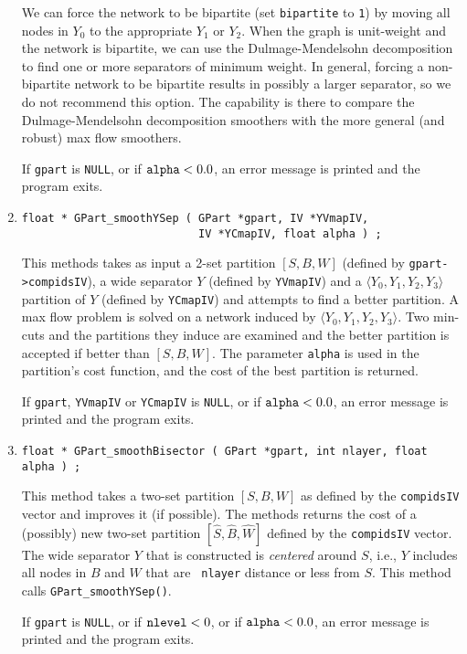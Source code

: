 \begin{enumerate}
We can force the network to be bipartite 
(set {\tt bipartite} to {\tt 1}) by moving all nodes in $Y_0$ to
the appropriate $Y_1$ or $Y_2$.
When the graph is unit-weight and the network is bipartite, 
we can use the Dulmage-Mendelsohn decomposition to find one 
or more separators of minimum weight.
In general, forcing a non-bipartite network to be bipartite results
in possibly a larger separator, so we do not recommend this option.
The capability is there to compare the Dulmage-Mendelsohn
decomposition smoothers with the more general (and robust) max
flow smoothers.
\par {}
If {\tt gpart} is {\tt NULL},
or if ${\tt alpha} < 0.0$,
an error message is printed and the program exits.
\item
\begin{verbatim}
float * GPart_smoothYSep ( GPart *gpart, IV *YVmapIV, 
                           IV *YCmapIV, float alpha ) ;
\end{verbatim}
This methods takes as input a 2-set partition $[S,B,W]$
(defined by {\tt gpart->compidsIV}), a wide separator $Y$
(defined by {\tt YVmapIV}) and a 
$\langle Y_0, Y_1, Y_2, Y_3 \rangle$ partition of $Y$
(defined by {\tt YCmapIV}) and attempts to find a better partition.
A max flow problem is solved on a network induced by
$\langle Y_0, Y_1, Y_2, Y_3 \rangle$.
Two min-cuts and the partitions they induce are examined and the
better partition is accepted if better than $[S,B,W]$.
The parameter {\tt alpha} is used in the partition's cost function,
and the cost of the best partition is returned.
\par {}
If {\tt gpart}, {\tt YVmapIV} or {\tt YCmapIV} is {\tt NULL},
or if ${\tt alpha} < 0.0$,
an error message is printed and the program exits.
\item
\begin{verbatim}
float * GPart_smoothBisector ( GPart *gpart, int nlayer, float alpha ) ;
\end{verbatim}
This method takes a two-set partition $[S,B,W]$ as defined by the
{\tt compidsIV} vector and improves it (if possible). 
The methods returns the cost of 
a (possibly) new two-set partition
$[{\widehat S}, {\widehat B}, {\widehat W}]$ 
defined by the {\tt compidsIV} vector.
The wide separator $Y$ that is constructed is {\it centered} around
$S$, i.e., $Y$ includes all nodes in $B$ and $W$ that are {\tt
nlayer} distance or less from $S$.
This method calls {\tt GPart\_smoothYSep()}.
\par {}
If {\tt gpart} is {\tt NULL},
or if ${\tt nlevel} < 0$,
or if ${\tt alpha} < 0.0$,
an error message is printed and the program exits.
\end{enumerate}
\par
